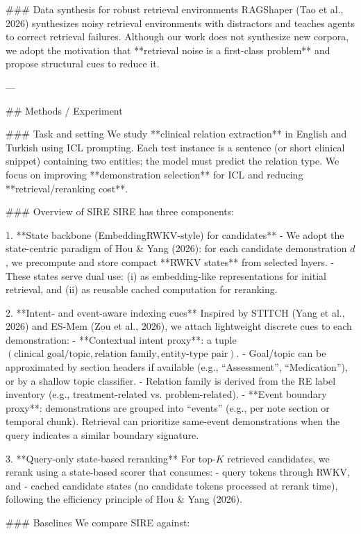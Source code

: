 ### Data synthesis for robust retrieval environments  
RAGShaper (Tao et al., 2026) synthesizes noisy retrieval environments with distractors and teaches agents to correct retrieval failures. Although our work does not synthesize new corpora, we adopt the motivation that **retrieval noise is a first-class problem** and propose structural cues to reduce it.

---

## Methods / Experiment  

### Task and setting  
We study **clinical relation extraction** in English and Turkish using ICL prompting. Each test instance is a sentence (or short clinical snippet) containing two entities; the model must predict the relation type. We focus on improving **demonstration selection** for ICL and reducing **retrieval/reranking cost**.

### Overview of SIRE  
SIRE has three components:

1. **State backbone (EmbeddingRWKV-style) for candidates**  
   - We adopt the state-centric paradigm of Hou & Yang (2026): for each candidate demonstration \(d\), we precompute and store compact **RWKV states** from selected layers.  
   - These states serve dual use: (i) as embedding-like representations for initial retrieval, and (ii) as reusable cached computation for reranking.

2. **Intent- and event-aware indexing cues**  
   Inspired by STITCH (Yang et al., 2026) and ES-Mem (Zou et al., 2026), we attach lightweight discrete cues to each demonstration:
   - **Contextual intent proxy**: a tuple \((\text{clinical goal/topic}, \text{relation family}, \text{entity-type pair})\).  
     - Goal/topic can be approximated by section headers if available (e.g., “Assessment”, “Medication”), or by a shallow topic classifier.  
     - Relation family is derived from the RE label inventory (e.g., treatment-related vs. problem-related).  
   - **Event boundary proxy**: demonstrations are grouped into “events” (e.g., per note section or temporal chunk). Retrieval can prioritize same-event demonstrations when the query indicates a similar boundary signature.

3. **Query-only state-based reranking**  
   For top-\(K\) retrieved candidates, we rerank using a state-based scorer that consumes:
   - query tokens through RWKV, and  
   - cached candidate states (no candidate tokens processed at rerank time),  
   following the efficiency principle of Hou & Yang (2026).

### Baselines  
We compare SIRE against:

